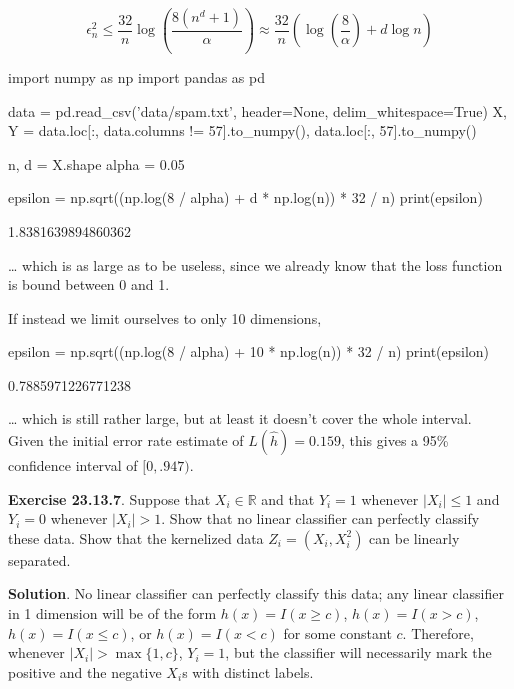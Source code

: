 \[ \epsilon_n^2 \leq \frac{32}{n} \log \left( \frac{8 (n^d + 1)}{\alpha} \right) \approx \frac{32}{n} \left( \log \left( \frac{8}{\alpha} \right) + d \log n\right) \]

\begin{python}
import numpy as np
import pandas as pd

data = pd.read_csv('data/spam.txt', header=None, delim_whitespace=True)
X, Y = data.loc[:, data.columns != 57].to_numpy(), data.loc[:, 57].to_numpy()
\end{python}

\begin{python}
n, d = X.shape
alpha = 0.05
\end{python}

\begin{python}
epsilon = np.sqrt((np.log(8 / alpha) + d * np.log(n)) * 32 / n)
print(epsilon)
\end{python}

\begin{console}
1.8381639894860362
\end{console}

\ldots{} which is as large as to be useless, since we already know that
the loss function is bound between 0 and 1.

If instead we limit ourselves to only 10 dimensions,

\begin{python}
epsilon = np.sqrt((np.log(8 / alpha) + 10 * np.log(n)) * 32 / n)
print(epsilon)
\end{python}

\begin{console}
0.7885971226771238
\end{console}

\ldots{} which is still rather large, but at least it doesn't cover the
whole interval. Given the initial error rate estimate of
\(L(\hat{h}) = 0.159\), this gives a 95\% confidence interval of
\([0, .947)\).

\textbf{Exercise 23.13.7}. Suppose that \(X_i \in \mathbb{R}\) and that
\(Y_i = 1\) whenever \(|X_i| \leq 1\) and \(Y_i = 0\) whenever
\(|X_i| > 1\). Show that no linear classifier can perfectly classify
these data. Show that the kernelized data \(Z_i = (X_i, X_i^2)\) can be
linearly separated.

\textbf{Solution}. No linear classifier can perfectly classify this
data; any linear classifier in 1 dimension will be of the form
\(h(x) = I(x \geq c)\), \(h(x) = I(x > c)\), \(h(x) = I(x \leq c)\), or
\(h(x) = I(x < c)\) for some constant \(c\). Therefore, whenever
\(|X_i| > \max \{ 1, c \}\), \(Y_i = 1\), but the classifier will
necessarily mark the positive and the negative \(X_i\)s with distinct
labels.

